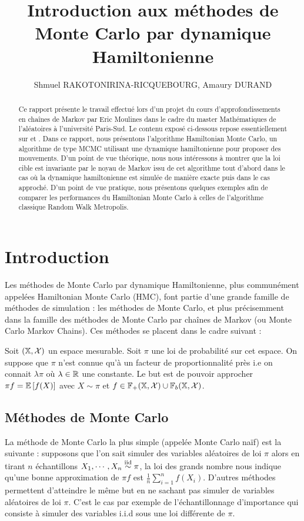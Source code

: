 \documentclass[10pt,a4paper]{article}
\title{Introduction aux méthodes de Monte Carlo par dynamique Hamiltonienne}
\author{Shmuel RAKOTONIRINA-RICQUEBOURG, Amaury DURAND}
\begin{document}
\maketitle

\begin{abstract}
Ce rapport présente le travail effectué lors d'un projet du cours d'approfondissements en chaînes de Markov par Eric Moulines dans le cadre du master Mathématiques de l'aléatoires à l'université Paris-Sud. Le contenu exposé ci-dessous repose essentiellement sur \cite{Neal-hmc} et \cite{Douc-mc}. Dans ce rapport, nous présentons l'algorithme Hamiltonian Monte Carlo, un algorithme de type MCMC utilisant une dynamique hamiltonienne pour proposer des mouvements. D'un point de vue théorique, nous nous intéressons à montrer que la loi cible est invariante par le noyau de Markov issu de cet algorithme tout d'abord dans le cas où la dynamique hamiltonienne est simulée de manière exacte puis dans le cas approché. D'un point de vue pratique, nous présentons quelques exemples afin de comparer les performances du Hamiltonian Monte Carlo à celles de l'algorithme classique Random Walk Metropolis. 
\end{abstract}

\tableofcontents
\section{Introduction}
Les méthodes de Monte Carlo par dynamique Hamiltonienne, plus communément appelées Hamiltonian Monte Carlo (HMC), font partie d'une grande famille de méthodes de simulation : les méthodes de Monte Carlo, et plus précisemment dans la famille des méthodes de Monte Carlo par chaînes de Markov (ou Monte Carlo Markov Chains). Ces méthodes se placent dans le cadre suivant :
\begin{Def}
	Soit $(\mathbb{X}, \mathcal{X})$ un espace mesurable. Soit $\pi$ une loi de probabilité sur cet espace. On suppose que $\pi$ n'est connue qu'à un facteur de proportionnalité près i.e on connait $\lambda \pi$ où $\lambda \in \mathbb{R}$ une constante. Le but est de pouvoir approcher $\pi f = \EE[f(X)]$ avec $X \sim \pi$ et $f \in \mathbb{F}_+(\mathbb{X}, \mathcal{X}) \cup \mathbb{F}_b(\mathbb{X}, \mathcal{X})$.
\end{Def}

\subsection{Méthodes de Monte Carlo}

La méthode de Monte Carlo la plus simple (appelée Monte Carlo naïf) est la suivante : supposons que l'on sait simuler des variables aléatoires de loi $\pi$ alors en tirant $n$ échantillons $X_1, \cdots, X_n \stackrel{\rm iid}{\sim} \pi$, la loi des grands nombre nous indique qu'une bonne approximation de $\pi f$ est $\frac{1}{n} \sum_{i=1}^n f(X_i)$. D'autres méthodes permettent d'atteindre le même but en ne sachant pas simuler de variables aléatoires de loi $\pi$. C'est le cas par exemple de l'échantillonnage d'importance qui consiste à simuler des variables i.i.d sous une loi différente de $\pi$.
\end{document}
